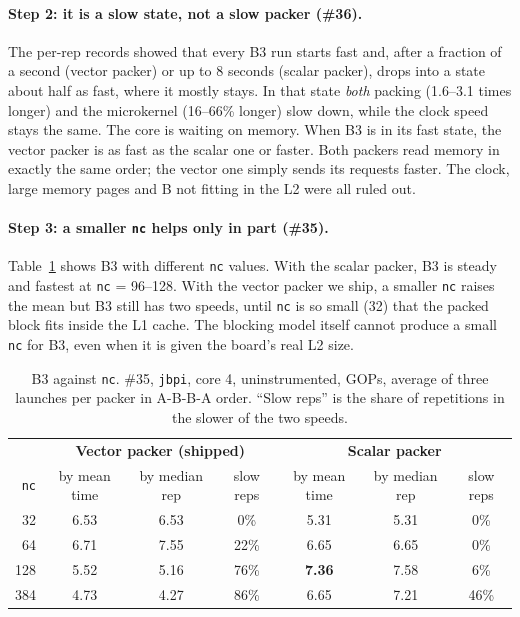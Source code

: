 \documentclass[11pt,a4paper]{article}
\newcommand{\good}[1]{\textcolor{green!45!black}{\textbf{#1}}}
\newcommand{\slow}[1]{\textcolor{red!70!black}{#1}}
\begin{document}
\paragraph{Step 2: it is a slow state, not a slow packer (\#36).} The per-rep records showed that every B3 run
starts fast and, after a fraction of a second (vector packer) or up to 8 seconds (scalar packer), drops into a
state about half as fast, where it mostly stays. In that state \emph{both} packing (1.6--3.1 times longer) and
the microkernel (16--66\% longer) slow down, while the clock speed stays the same. The core is waiting on memory.
When B3 is in its fast state, the vector packer is as fast as the scalar one or faster. Both packers read memory
in exactly the same order; the vector one simply sends its requests faster. The clock, large memory pages and B
not fitting in the L2 were all ruled out.

\paragraph{Step 3: a smaller \texttt{nc} helps only in part (\#35).} Table~\ref{tab:nc} shows B3 with different
\texttt{nc} values. With the scalar packer, B3 is steady and fastest at \texttt{nc} = 96--128. With the vector
packer we ship, a smaller \texttt{nc} raises the mean but B3 still has two speeds, until \texttt{nc} is so small
(32) that the packed block fits inside the L1 cache. The blocking model itself cannot produce a small \texttt{nc}
for B3, even when it is given the board's real L2 size.

\begin{table}[h]
\centering\small
\begin{tabular}{@{}r|ccc|ccc@{}}
\toprule
& \multicolumn{3}{c|}{\textbf{Vector packer (shipped)}} & \multicolumn{3}{c}{\textbf{Scalar packer}} \\
\texttt{nc} & by mean time & by median rep & slow reps & by mean time & by median rep & slow reps \\
\midrule
32  & 6.53 & 6.53 & 0\%  & 5.31 & 5.31 & 0\% \\
64  & 6.71 & 7.55 & 22\% & 6.65 & 6.65 & 0\% \\
128 & 5.52 & 5.16 & 76\% & \good{7.36} & 7.58 & 6\% \\
384 & \slow{4.73} & 4.27 & 86\% & 6.65 & 7.21 & 46\% \\
\bottomrule
\end{tabular}
\caption{B3 against \texttt{nc}. \#35, \texttt{jbpi}, core 4, uninstrumented, GOPs, average of three launches per
packer in A-B-B-A order. ``Slow reps'' is the share of repetitions in the slower of the two speeds.}
\label{tab:nc}
\end{table}
\end{document}
